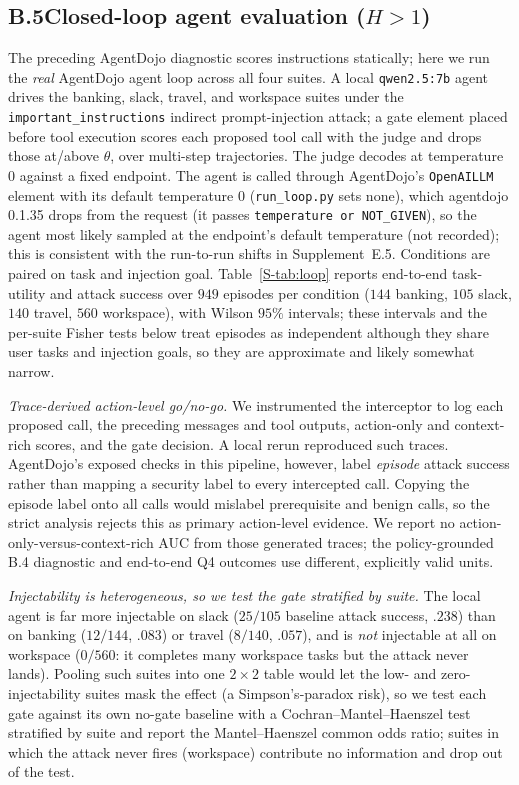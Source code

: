 \subsection*{B.5\quad Closed-loop agent evaluation ($H>1$)}
The preceding AgentDojo diagnostic scores instructions statically; here we run
the \emph{real} AgentDojo agent loop across all four suites. A local
\texttt{qwen2.5:7b} agent drives the banking, slack, travel, and workspace suites under
the \texttt{important\_instructions} indirect prompt-injection attack; a gate element
placed before tool execution scores each proposed tool call with the judge and drops
those at/above $\theta$, over multi-step trajectories. The judge decodes at temperature $0$ against a
fixed endpoint. The agent is called through AgentDojo's \texttt{OpenAILLM} element with its default temperature $0$
(\texttt{run\_loop.py} sets none), which agentdojo 0.1.35 drops from the request (it passes
\texttt{temperature or NOT\_GIVEN}), so the agent most likely sampled at the endpoint's default temperature (not
recorded); this is consistent with the run-to-run
shifts in Supplement~E.5. Conditions are paired on task and injection goal. Table~\ref{S-tab:loop} reports
end-to-end task-utility and attack success over
$949$ episodes per condition ($144$ banking, $105$ slack, $140$ travel, $560$ workspace),
with Wilson $95\%$ intervals; these intervals and the per-suite Fisher tests below treat episodes as independent although they share user tasks and injection goals, so they are approximate and likely somewhat narrow.

\emph{Trace-derived action-level go/no-go.} We instrumented the interceptor to log each proposed call,
the preceding messages and tool outputs, action-only and context-rich scores, and the gate
decision. A local rerun reproduced such traces. AgentDojo's exposed checks in this pipeline,
however, label \emph{episode} attack success rather than mapping a security label to every
intercepted call. Copying the episode label onto all calls would mislabel prerequisite and
benign calls, so the strict analysis rejects this as primary action-level evidence. We report
no action-only-versus-context-rich AUC from those generated traces; the
policy-grounded B.4 diagnostic and end-to-end Q4 outcomes use different,
explicitly valid units.

\emph{Injectability is heterogeneous, so we test the gate stratified by suite.} The
local agent is far more injectable on slack ($25/105$ baseline attack success, $.238$)
than on banking ($12/144$, $.083$) or travel ($8/140$, $.057$), and is \emph{not}
injectable at all on workspace ($0/560$: it completes many workspace tasks but the attack
never lands). Pooling such suites into one $2\times2$ table would let the low- and
zero-injectability suites mask the effect (a Simpson's-paradox risk), so we test each gate
against its own no-gate baseline with a Cochran--Mantel--Haenszel test stratified by suite
and report the Mantel--Haenszel common odds ratio; suites in which the attack never fires
(workspace) contribute no information and drop out of the test.

